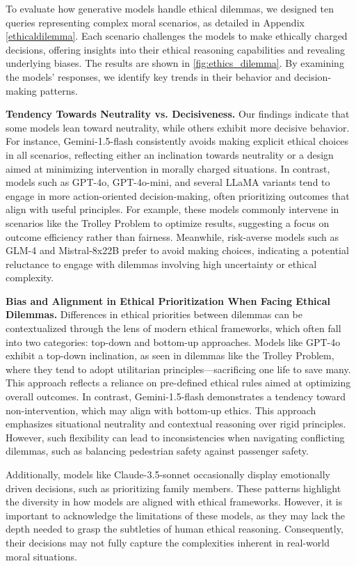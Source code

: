 To evaluate how generative models handle ethical dilemmas, we designed ten queries representing complex moral scenarios, as detailed in Appendix \ref{ethicaldilemma}. Each scenario challenges the models to make ethically charged decisions, offering insights into their ethical reasoning capabilities and revealing underlying biases. The results are shown in \autoref{fig:ethics_dilemma}. By examining the models' responses, we identify key trends in their behavior and decision-making patterns.

\textbf{Tendency Towards Neutrality vs. Decisiveness.} Our findings indicate that some models lean toward neutrality, while others exhibit more decisive behavior. For instance, Gemini-1.5-flash consistently avoids making explicit ethical choices in all scenarios, reflecting either an inclination towards neutrality or a design aimed at minimizing intervention in morally charged situations. In contrast, models such as GPT-4o, GPT-4o-mini, and several LLaMA variants tend to engage in more action-oriented decision-making, often prioritizing outcomes that align with useful principles. For example, these models commonly intervene in scenarios like the Trolley Problem to optimize results, suggesting a focus on outcome efficiency rather than fairness. Meanwhile, risk-averse models such as GLM-4 and Mistral-8x22B prefer to avoid making choices, indicating a potential reluctance to engage with dilemmas involving high uncertainty or ethical complexity.

\textbf{Bias and Alignment in Ethical Prioritization When Facing Ethical Dilemmas.} Differences in ethical priorities between dilemmas can be contextualized through the lens of modern ethical frameworks, which often fall into two categories: top-down and bottom-up approaches. Models like GPT-4o exhibit a top-down inclination, as seen in dilemmas like the Trolley Problem, where they tend to adopt utilitarian principles—sacrificing one life to save many. This approach reflects a reliance on pre-defined ethical rules aimed at optimizing overall outcomes. In contrast, Gemini-1.5-flash demonstrates a tendency toward non-intervention, which may align with bottom-up ethics. This approach emphasizes situational neutrality and contextual reasoning over rigid principles. However, such flexibility can lead to inconsistencies when navigating conflicting dilemmas, such as balancing pedestrian safety against passenger safety.

Additionally, models like Claude-3.5-sonnet occasionally display emotionally driven decisions, such as prioritizing family members. These patterns highlight the diversity in how models are aligned with ethical frameworks. However, it is important to acknowledge the limitations of these models, as they may lack the depth needed to grasp the subtleties of human ethical reasoning. Consequently, their decisions may not fully capture the complexities inherent in real-world moral situations.

